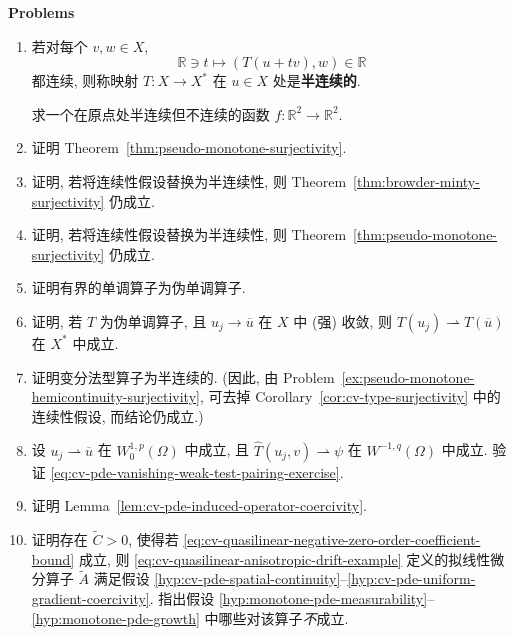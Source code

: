 \textbf{Problems}

\begin{enumerate}[label=\thesection.\arabic*.,ref=\thesection.\arabic*,start=16,series=book-problems]

\item\label{ex:hemicontinuity-not-continuity-origin} 若对每个 $v,w\in X$,
\begin{equation}\label{eq:hemicontinuity-scalar-pairing-along-line}
\mathbb{R}\ni t\mapsto(T(u+tv),w)\in\mathbb{R}
\end{equation}
都连续, 则称映射 $T:X\to X^*$ 在 $u\in X$ 处是\textbf{半连续的}.\par 求一个在原点处半连续但不连续的函数 $f:\mathbb{R}^2\to\mathbb{R}^2$.

\item\label{ex:pseudo-monotone-surjectivity-proof} 证明 Theorem~\ref{thm:pseudo-monotone-surjectivity}.

\item\label{ex:browder-minty-hemicontinuity-surjectivity} 证明, 若将连续性假设替换为半连续性, 则 Theorem~\ref{thm:browder-minty-surjectivity} 仍成立.

\item\label{ex:pseudo-monotone-hemicontinuity-surjectivity} 证明, 若将连续性假设替换为半连续性, 则 Theorem~\ref{thm:pseudo-monotone-surjectivity} 仍成立.

\item\label{ex:bounded-monotone-implies-pseudo-monotone} 证明有界的单调算子为伪单调算子.

\item\label{ex:pseudo-monotone-strong-to-weak-continuity} 证明, 若 $T$ 为伪单调算子, 且 $u_j\to\overline u$ 在 $X$ 中 (强) 收敛, 则 $T(u_j)\rightharpoonup T(\overline u)$ 在 $X^*$ 中成立.

\item\label{ex:cv-type-operator-hemicontinuity} 证明变分法型算子为半连续的. (因此, 由 Problem~\ref{ex:pseudo-monotone-hemicontinuity-surjectivity}, 可去掉 Corollary~\ref{cor:cv-type-surjectivity} 中的连续性假设, 而结论仍成立.)

\item\label{ex:cv-pde-vanishing-weak-test-pairing} 设 $u_j\rightharpoonup\overline u$ 在 $W_0^{1,p}(\Omega)$ 中成立, 且 $\widehat T(u_j,v)\rightharpoonup\psi$ 在 $W^{-1,q}(\Omega)$ 中成立. 验证 \eqref{eq:cv-pde-vanishing-weak-test-pairing-exercise}.

\item\label{ex:cv-pde-induced-operator-coercivity-proof} 证明 Lemma~\ref{lem:cv-pde-induced-operator-coercivity}.

\item\label{ex:cv-pde-drift-example-hypotheses} 证明存在 $\widetilde C>0$, 使得若 \eqref{eq:cv-quasilinear-negative-zero-order-coefficient-bound} 成立, 则 \eqref{eq:cv-quasilinear-anisotropic-drift-example} 定义的拟线性微分算子 $\widetilde A$ 满足假设 \ref{hyp:cv-pde-spatial-continuity}--\ref{hyp:cv-pde-uniform-gradient-coercivity}. 指出假设 \ref{hyp:monotone-pde-measurability}--\ref{hyp:monotone-pde-growth} 中哪些对该算子\emph{不}成立.

\end{enumerate}
